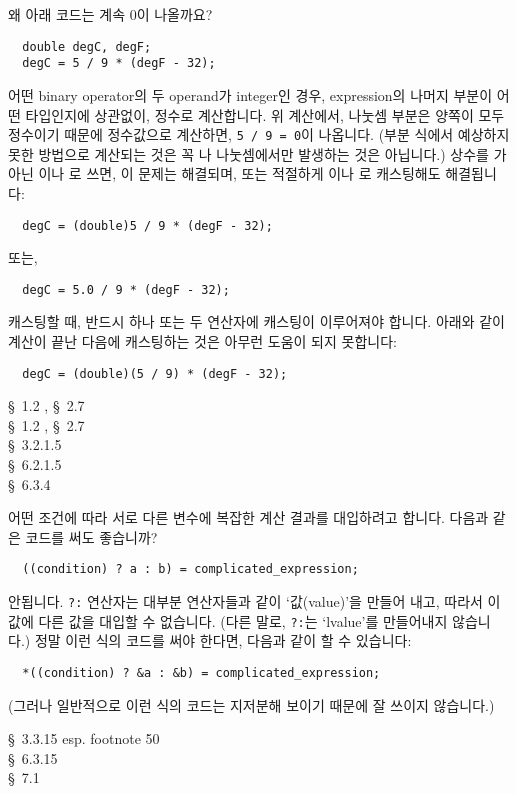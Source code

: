 \begin{faq}
        왜 아래 코드는 계속 0이 나올까요?
\begin{verbatim}
  double degC, degF;
  degC = 5 / 9 * (degF - 32);
\end{verbatim}

\A
        어떤 binary operator의 두 operand가 integer인 경우, expression의 나머지
        부분이 어떤 타입인지에 상관없이, 정수로 계산합니다. 위 계산에서, 나눗셈 부분은 양쪽이
        모두 정수이기 때문에 정수값으로 계산하면, \verb+5 / 9 = 0+이 나옵니다. 
        (부분 식에서 예상하지 못한 방법으로 계산되는 것은 꼭 나 나눗셈에서만 발생하는
        것은 아닙니다.) 상수를 가 아닌 이나 로 쓰면,
        이 문제는 해결되며, 또는 적절하게 이나 로 캐스팅해도
        해결됩니다:
\begin{verbatim}
  degC = (double)5 / 9 * (degF - 32);
\end{verbatim}
        또는,
\begin{verbatim}
  degC = 5.0 / 9 * (degF - 32);
\end{verbatim}
        캐스팅할 때, 반드시 하나 또는 두 연산자에 캐스팅이 이루어져야 합니다. 아래와 같이
        계산이 끝난 다음에 캐스팅하는 것은 아무런 도움이 되지 못합니다:
\begin{verbatim}
  degC = (double)(5 / 9) * (degF - 32);
\end{verbatim}

\R
        \cite{kr1} \S\ 1.2 , \S\ 2.7  \\
        \cite{kr2} \S\ 1.2 , \S\ 2.7  \\
        \cite{ansi} \S\ 3.2.1.5 \\
        \cite{c89} \S\ 6.2.1.5 \\
        \cite{hs} \S\ 6.3.4 
\end{faq}

\begin{faq}
	어떤 조건에 따라 서로 다른 변수에 복잡한 계산 결과를 대입하려고 합니다.
	다음과 같은 코드를 써도 좋습니까?

\begin{verbatim}
  ((condition) ? a : b) = complicated_expression;
\end{verbatim}

\A
	안됩니다.  \verb+?:+ 연산자는 대부분 연산자들과 같이 
	`값(value)'을 만들어 내고, 따라서 이 값에 다른 값을 
	대입할 수 없습니다.	(다른 말로, \verb+?:+는 `lvalue'를 만들어내지 않습니다.) 정말 
	이런 식의 코드를 써야 한다면, 다음과 같이 할 수 있습니다:

\begin{verbatim}
  *((condition) ? &a : &b) = complicated_expression;
\end{verbatim}

	\noindent (그러나 일반적으로 이런 식의 코드는 지저분해 보이기 때문에
	잘 쓰이지 않습니다.)

\R
        \cite{ansi} \S\ 3.3.15 esp. footnote 50 \\
	\cite{c89} \S\ 6.3.15 \\
	\cite{hs} \S\ 7.1 
\end{faq}


